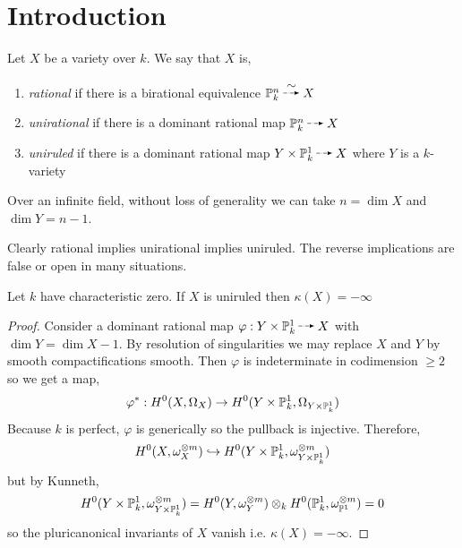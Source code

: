\documentclass[12pt]{article}
\begin{document}
\section{Introduction}

\newcommand{\barM}{\overline{\M}}
\newcommand{\ff}{\mathbb{F}}
\newcommand{\barF}{\overline{\mathbb{F}}}
\newcommand{\Frob}{\mathrm{Frob}}

\begin{defn}
Let $X$ be a variety over $k$. We say that $X$ is,
\begin{enumerate}
\item \textit{rational} if there is a birational equivalence $\P^n_k \birat X$
\item \textit{unirational} if there is a dominant rational map $\P^n_k \rat X$
\item \textit{uniruled} if there is a dominant rational map $Y \times \P^1_k \rat X$ where $Y$ is a $k$-variety
\end{enumerate}
\end{defn}

\begin{rmk}
Over an infinite field, without loss of generality we can take $n = \dim{X}$ and $\dim{Y} = n - 1$.
\end{rmk}

\begin{rmk}
Clearly rational implies unirational implies uniruled. The reverse implications are false or open in many situations.
\end{rmk}

\begin{prop}
Let $k$ have characteristic zero. If $X$ is uniruled then $\kappa(X) = -\infty$
\end{prop}

\begin{proof}
Consider a dominant rational map $\varphi : Y \times \P^1_k \rat X$ with $\dim{Y} = \dim{X} - 1$. By resolution of singularities we may replace $X$ and $Y$ by smooth compactifications smooth. Then $\varphi$ is indeterminate in codimension $\ge 2$ so we get a map,
\[ \varphi^* : H^0(X, \Omega_X) \to H^0(Y \times \P^1_k, \Omega_{Y \times \P^1_k}) \]
Because $k$ is perfect, $\varphi$ is generically \etale so the pullback is injective. Therefore,
\[ H^0(X, \omega_X^{\otimes m}) \embed H^0(Y \times \P^1_k, \omega_{Y \times \P^1_k}^{\otimes m}) \]
but by Kunneth,
\[ H^0(Y \times \P^1_k, \omega_{Y \times \P^1_k}^{\otimes m}) = H^0(Y, \omega_Y^{\otimes m}) \otimes_k H^0(\P^1_k, \omega_{\P^1}^{\otimes m}) = 0 \]
so the pluricanonical invariants of $X$ vanish i.e. $\kappa(X) = -\infty$.
\end{proof}
\end{document}
